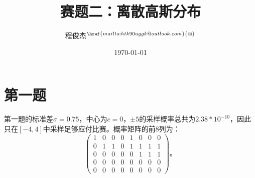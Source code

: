 \documentclass{article}
\title{赛题二：离散高斯分布}
\author{程俊杰$^{\href{mailto:htk90uggk@outlook.com}{\textrm{\Letter}}}$}
\date{\today}
\begin{document}
    \maketitle
    \section{第一题}
    第一题的标准差$\sigma = 0.75$，中心为$c = 0$，$\pm5$的采样概率总共为$2.38 * 10^{-10}$，因此只在$[-4, 4]$中采样足够应付比赛。概率矩阵的前8列为：
    \begin{equation}
        \begin{pmatrix}
            1 & 0 & 0 & 0 & 1 & 0 & 0 & 0 \\
            0 & 1 & 1 & 0 & 1 & 1 & 1 & 1 \\
            0 & 0 & 0 & 0 & 0 & 1 & 1 & 1 \\
            0 & 0 & 0 & 0 & 0 & 0 & 0 & 0 \\
            0 & 0 & 0 & 0 & 0 & 0 & 0 & 0
        \end{pmatrix}
        \mbox{。}
    \end{equation}
    
\end{document}
